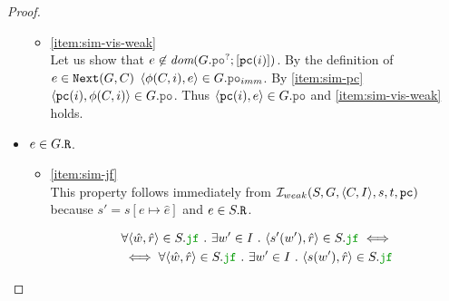 \documentclass[12pt]{article}
\begin{document}
\begin{proof}
\begin{itemize}
\begin{itemize}
      
      
      

    \item \ref{item:sim-vis-weak} \\
      Let us show that $e \not\in \dom{G.\lPO^?;[\lPC(i)]}$.
      By the definition of $e \in {\mathtt{Next}}(G, C)$ $\tup{\front(C, i), e} \in G.\lPO_{imm}$.
      By \ref{item:sim-pc} $\tup{\lPC(i), \front(C, i)} \in G.\lPO$.
      Thus $\tup{\lPC(i), e} \in G.\lPO$ and \ref{item:sim-vis-weak} holds.

    \end{itemize}

  \item $e \in G.{\mathtt{R}}$.
    \begin{itemize}

    \item \ref{item:sim-jf} \\
      This property follows immediately from $\mathcal{I}_{weak}(S, G, \langle C, I \rangle, s, t, {\mathtt{pc}})$
      because $s' = s[e \mapsto \hat{e}]$ and $e \in S.{\mathtt{R}}$.

      \begin{equation*}
        \begin{split}
          & \forall{\tup{\hat{w}, \hat{r}} \in S.\lJF} ~.~
            \exists{w' \in I} ~.~ \tup{s'(w'), \hat{r}} \in S.\lJF \iff \\
          & \iff \forall{\tup{\hat{w}, \hat{r}} \in S.\lJF} ~.~
            \exists{w' \in I} ~.~ \tup{s(w'), \hat{r}} \in S.\lJF
        \end{split}
      \end{equation*}

    \end{itemize}  
    
  \end{itemize}
  

\end{proof}
\end{document}
